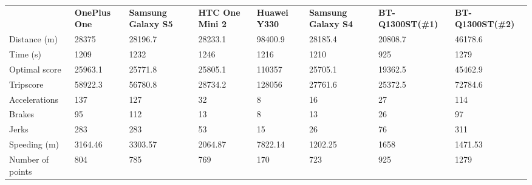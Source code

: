 \begin{landscape}
\begin{table*}[h]
\begin{minipage}{0.95\textwidth}
\begin{tabular}{|l|lllllll|}
                 & \textbf{OnePlus One} & \textbf{Samsung Galaxy S5} & \textbf{HTC One Mini 2} & \textbf{Huawei Y330} & \textbf{Samsung Galaxy S4} & \textbf{BT-Q1300ST(\#1)} & \textbf{BT-Q1300ST(\#2)} \\
Distance (m)     & 28375       & 28196.7           & 28233.1        & 98400.9     & 28185.4           & 20808.7         & 46178.6         \\
Time (s)         & 1209        & 1232              & 1246           & 1216        & 1210              & 925             & 1279            \\
Optimal score    & 25963.1     & 25771.8           & 25805.1        & 110357      & 25705.1           & 19362.5         & 45462.9         \\
Tripscore        & 58922.3     & 56780.8           & 28734.2        & 128056      & 27761.6           & 25372.5         & 72784.6         \\
Accelerations    & 137         & 127               & 32             & 8           & 16                & 27              & 114             \\
Brakes           & 95          & 112               & 13             & 8           & 13                & 26              & 97              \\
Jerks            & 283         & 283               & 53             & 15          & 26                & 76              & 311             \\
Speeding (m)     & 3164.46     & 3303.57           & 2064.87        & 7822.14     & 1202.25           & 1658            & 1471.53         \\
Number of points & 804         & 785               & 769            & 170         & 723               & 925             & 1279      \\\hline     

\end{tabular}
\end{minipage}
\end{table*}
\end{landscape}

\newpage


